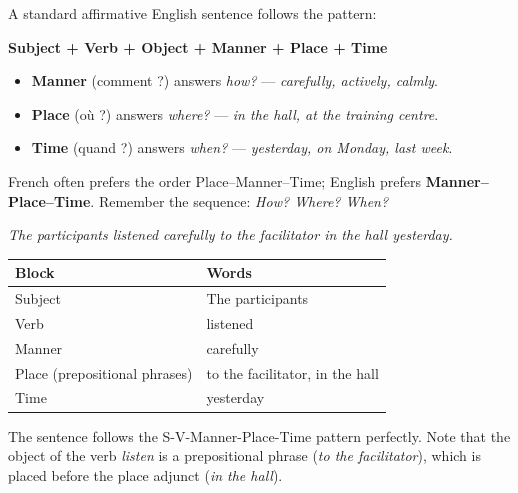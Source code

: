 \documentclass[11pt]{article}
\begin{document}
\begin{definition}
A standard affirmative English sentence follows the pattern:
\begin{center}
\textbf{Subject + Verb + Object + Manner + Place + Time}
\end{center}
\begin{itemize}
\item \textbf{Manner} (comment ?) answers \emph{how?} --- \emph{carefully, actively, calmly}.
\item \textbf{Place} (où ?) answers \emph{where?} --- \emph{in the hall, at the training centre}.
\item \textbf{Time} (quand ?) answers \emph{when?} --- \emph{yesterday, on Monday, last week}.
\end{itemize}
French often prefers the order Place--Manner--Time; English prefers \textbf{Manner--Place--Time}. Remember the sequence: \emph{How? Where? When?}
\end{definition}

\begin{exemplebox}
\emph{The participants listened carefully to the facilitator in the hall yesterday.}
\begin{center}
\begin{tabularx}{\linewidth}{|l|X|}\hline
\rowcolor{popblueL} \textbf{Block} & \textbf{Words} \\ \hline
Subject & The participants \\ \hline
Verb & listened \\ \hline
Manner & carefully \\ \hline
Place (prepositional phrases) & to the facilitator, in the hall \\ \hline
Time & yesterday \\ \hline
\end{tabularx}
\end{center}
The sentence follows the S-V-Manner-Place-Time pattern perfectly. Note that the object of the verb \emph{listen} is a prepositional phrase (\emph{to the facilitator}), which is placed before the place adjunct (\emph{in the hall}).
\end{exemplebox}
\end{document}
